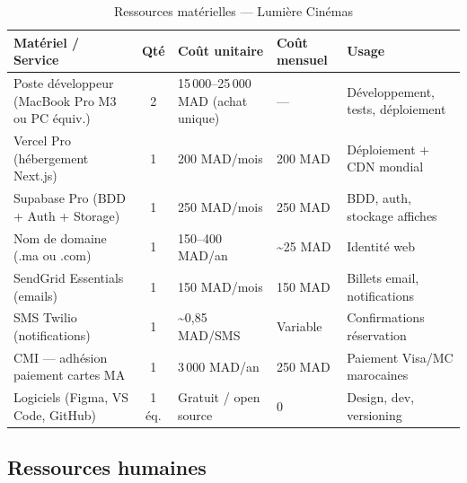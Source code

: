 \documentclass[12pt,a4paper,openany]{report}
\begin{document}
\begin{table}[H]
\centering
\footnotesize
\begin{tabular}{p{4cm}cp{3.5cm}p{2.2cm}p{3.5cm}}
\toprule
\textbf{Matériel / Service} & \textbf{Qté} & \textbf{Coût unitaire} & \textbf{Coût mensuel} & \textbf{Usage} \\
\midrule
Poste développeur (MacBook Pro M3 ou PC équiv.) & 2 & 15\,000–25\,000 MAD (achat unique) & --- & Développement, tests, déploiement \\
Vercel Pro (hébergement Next.js) & 1 & 200 MAD/mois & 200 MAD & Déploiement + CDN mondial \\
Supabase Pro (BDD + Auth + Storage) & 1 & 250 MAD/mois & 250 MAD & BDD, auth, stockage affiches \\
Nom de domaine (.ma ou .com) & 1 & 150–400 MAD/an & \textasciitilde{}25 MAD & Identité web \\
SendGrid Essentials (emails) & 1 & 150 MAD/mois & 150 MAD & Billets email, notifications \\
SMS Twilio (notifications) & 1 & \textasciitilde{}0,85 MAD/SMS & Variable & Confirmations réservation \\
CMI — adhésion paiement cartes MA & 1 & 3\,000 MAD/an & 250 MAD & Paiement Visa/MC marocaines \\
Logiciels (Figma, VS Code, GitHub) & 1 éq. & Gratuit / open source & 0 & Design, dev, versioning \\
\bottomrule
\end{tabular}
\caption{Ressources matérielles — Lumière Cinémas}
\label{tab:materiel}
\end{table}

\subsection{Ressources humaines}
\end{document}
